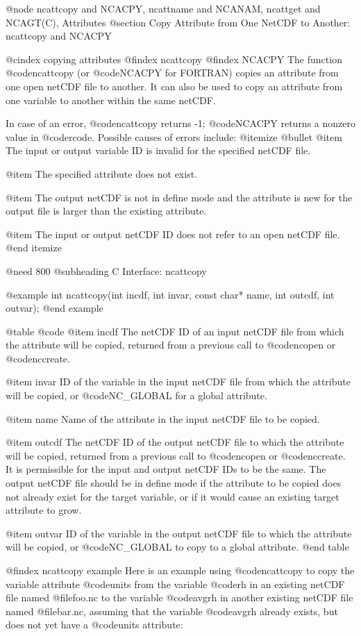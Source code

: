 {@node ncattcopy and NCACPY, ncattname and NCANAM, ncattget and NCAGT(C), Attributes
@section Copy Attribute from One NetCDF to Another:  ncattcopy and NCACPY

@cindex copying attributes
@findex ncattcopy
@findex NCACPY
The function @code{ncattcopy} (or @code{NCACPY} for FORTRAN) copies an
attribute from one open netCDF file to another.  It can also be used to
copy an attribute from one variable to another within the same netCDF.

In case of an error, @code{ncattcopy} returns -1; @code{NCACPY} returns a
nonzero value in @code{rcode}.  Possible causes of errors include:
@itemize @bullet
@item
The input or output variable ID is invalid for the specified netCDF file.

@item
The specified attribute does not exist.

@item
The output netCDF is not in define mode and the attribute is new for the
output file is larger than the existing attribute.

@item
The input or output netCDF ID does not refer to an open netCDF file.
@end itemize

@need 800
@subheading C Interface:  ncattcopy

@example
int ncattcopy(int incdf, int invar, const char* name, int outcdf, int outvar);
@end example

@table @code
@item incdf
The netCDF ID of an input netCDF file from which the attribute will be copied,
returned from a previous call to @code{ncopen} or @code{nccreate}.

@item invar
ID of the variable in the input netCDF file from which the
attribute will be copied, or @code{NC_GLOBAL} for a global attribute.

@item name
Name of the attribute in the input netCDF file to be copied.

@item outcdf
The netCDF ID of the output netCDF file to which the attribute will be copied,
returned from a previous call to @code{ncopen} or @code{nccreate}.  It
is permissible for the input and output netCDF IDs to be the same.  The
output netCDF file should be in define mode if the attribute to be
copied does not already exist for the target variable, or if it would
cause an existing target attribute to grow.

@item outvar
ID of the variable in the output netCDF file to which the attribute will
be copied, or @code{NC_GLOBAL} to copy to a global attribute.
@end table

@findex ncattcopy example
Here is an example using @code{ncattcopy} to copy the variable attribute
@code{units} from the variable @code{rh} in an existing netCDF file
named @file{foo.nc} to the variable @code{avgrh} in another existing
netCDF file named @file{bar.nc}, assuming that the variable
@code{avgrh} already exists, but does not yet have a @code{units}
attribute:

}
